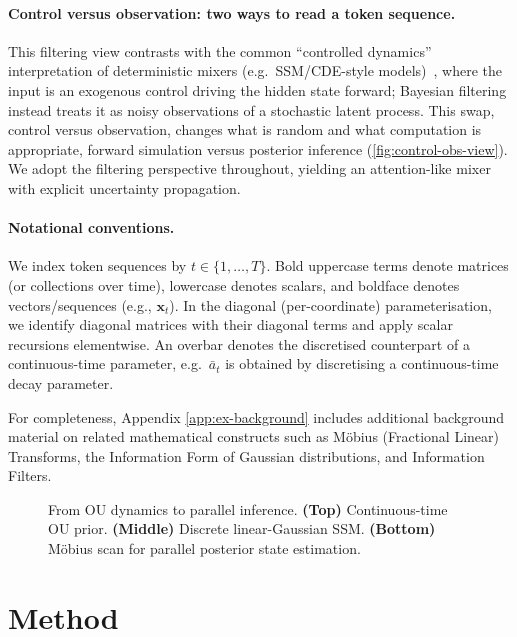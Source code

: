 \documentclass{article}
\begin{document}
\paragraph{Control versus observation: two ways to read a token sequence.}
This filtering view contrasts with the common ``controlled dynamics'' interpretation of deterministic mixers (e.g.\ SSM/CDE-style models)~\citep{muca2024theoretical}, where the input is an exogenous control driving the hidden state forward; Bayesian filtering instead treats it as noisy observations of a stochastic latent process. This swap, control versus observation, changes what is random and what computation is appropriate, forward simulation versus posterior inference (\cref{fig:control-obs-view}). We adopt the filtering perspective throughout, yielding an attention-like mixer with explicit uncertainty propagation.

\paragraph{Notational conventions.}
We index token sequences by $t\in\{1,\dots,T\}$. Bold uppercase terms denote matrices (or collections over time), lowercase denotes scalars, and boldface denotes vectors/sequences (e.g., $\mathbf{x}_t$).
In the diagonal (per-coordinate) parameterisation, we identify diagonal matrices with their diagonal terms and apply scalar recursions elementwise. An overbar denotes the discretised counterpart of a continuous-time parameter, e.g.\ $\bar a_t$ is obtained by discretising a continuous-time decay parameter.


For completeness, Appendix \ref{app:ex-background} includes additional background material on related mathematical constructs such as M\"{o}bius (Fractional Linear) Transforms, the Information Form of Gaussian distributions, and Information Filters.

\begin{figure}[t]
  \centering
  \resizebox{0.92\columnwidth}{!}{\tikzOUHybridTall}
  \caption{From OU dynamics to parallel inference.
  \textbf{(Top)} Continuous-time OU prior.
  \textbf{(Middle)} Discrete linear-Gaussian SSM.
  \textbf{(Bottom)} M\"{o}bius scan for parallel posterior state estimation.\vspace{-0.1in}}
  \label{fig:ou-hybrid-tall}
\end{figure}
\section{Method}
\label{sec:method}
\end{document}
